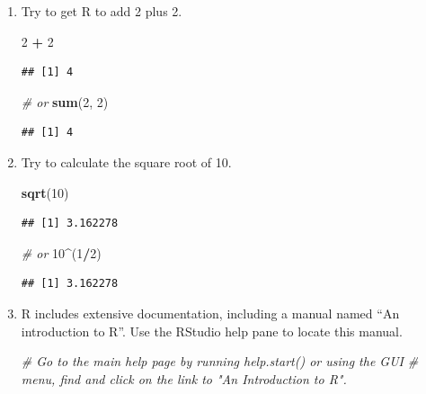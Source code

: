 \documentclass[
]{book}
\newenvironment{Shaded}{\begin{snugshade}}{\end{snugshade}}
\newcommand{\CommentTok}[1]{\textcolor[rgb]{0.56,0.35,0.01}{\textit{#1}}}
\newcommand{\DecValTok}[1]{\textcolor[rgb]{0.00,0.00,0.81}{#1}}
\newcommand{\KeywordTok}[1]{\textcolor[rgb]{0.13,0.29,0.53}{\textbf{#1}}}
\newcommand{\NormalTok}[1]{#1}
\newcommand{\OperatorTok}[1]{\textcolor[rgb]{0.81,0.36,0.00}{\textbf{#1}}}
\newcommand{\StringTok}[1]{\textcolor[rgb]{0.31,0.60,0.02}{#1}}
\begin{document}
\begin{enumerate}
\def\labelenumi{\arabic{enumi}.}
\item
  Try to get R to add 2 plus 2.

\begin{Shaded}
\begin{Highlighting}[]
\DecValTok{2} \OperatorTok{+}\StringTok{ }\DecValTok{2}
\end{Highlighting}
\end{Shaded}

\begin{verbatim}
## [1] 4
\end{verbatim}

\begin{Shaded}
\begin{Highlighting}[]
\CommentTok{\# or}
\KeywordTok{sum}\NormalTok{(}\DecValTok{2}\NormalTok{, }\DecValTok{2}\NormalTok{)}
\end{Highlighting}
\end{Shaded}

\begin{verbatim}
## [1] 4
\end{verbatim}
\item
  Try to calculate the square root of 10.

\begin{Shaded}
\begin{Highlighting}[]
\KeywordTok{sqrt}\NormalTok{(}\DecValTok{10}\NormalTok{)}
\end{Highlighting}
\end{Shaded}

\begin{verbatim}
## [1] 3.162278
\end{verbatim}

\begin{Shaded}
\begin{Highlighting}[]
\CommentTok{\# or}
\DecValTok{10}\OperatorTok{\^{}}\NormalTok{(}\DecValTok{1}\OperatorTok{/}\DecValTok{2}\NormalTok{)}
\end{Highlighting}
\end{Shaded}

\begin{verbatim}
## [1] 3.162278
\end{verbatim}
\item
  R includes extensive documentation, including a manual named ``An introduction to R''. Use the RStudio help pane to locate this manual.

\begin{Shaded}
\begin{Highlighting}[]
\CommentTok{\# Go to the main help page by running \textquotesingle{}help.start() or using the GUI}
\CommentTok{\# menu, find and click on the link to "An Introduction to R".}
\end{Highlighting}
\end{Shaded}
\end{enumerate}
\end{document}
